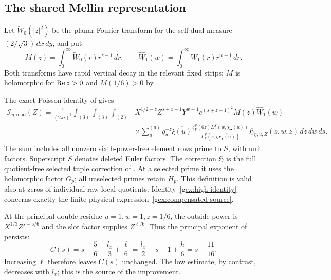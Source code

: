 \subsection{The shared Mellin representation}

Let $\widetilde W_0(|z|^2)$ be the planar Fourier transform for the
self-dual measure $(2/\sqrt3)\,dx\,dy$, and put
\[
 M(z)=\int_0^\infty\widetilde W_0(r)r^{z-1}\,dr,
 \qquad \widehat W_1(w)=\int_0^\infty W_1(r)r^{w-1}\,dr.
\]
Both transforms have rapid vertical decay in the relevant fixed
strips; $M$ is holomorphic for $\operatorname{Re} z>0$ and $M(1/6)>0$
by \cite[Section 7.1]{OAI26}.

The exact Poisson identity of \cite[Section 16.1]{OAI26} gives
\begin{equation}\label{gex:high-identity}
\begin{split}
 \mathcal I_{\eta,\mathrm{mod}}(Z)
 =\frac1{(2\pi i)^3}\int_{(3)}\int_{(3)}\int_{(2)}
 &X^{1/2-z}Z^{s+z-1}Y^{w-1}
   e^{(s+z-1)^2}M(z)\widehat W_1(w)\\
 &\times\sum_u^{(6)}q_u^{-z}\overline{\xi(u)}
 \frac{\zeta_F^S(6z)L_F^S(w,\chi_\bullet(u))}{
       L_F^S(s,\eta\overline{\chi_\bullet(u)})}
 \mathfrak H_{\eta,u,Z}(s,w,z)\,dz\,dw\,ds.
\end{split}
\end{equation}
The sum includes all nonzero sixth-power-free element rows prime
to $S$, with unit factors. Superscript $S$ denotes deleted Euler
factors. The correction $\mathfrak H$ is the full quotient-free
selected tuple correction of \cite[(16.3)]{OAI26}. At a selected
prime it uses the holomorphic factor $G_p$; all unselected primes
retain $H_p$. This definition is valid also at zeros of individual
raw local quotients. Identity~\eqref{gex:high-identity} concerns
exactly the finite physical expression~\eqref{gex:compensated-source}.

At the principal double residue $u=1,w=1,z=1/6$, the outside
power is $X^{1/3}Z^{s-5/6}$ and the slot factor supplies
$Z^{\ell/6}$. Thus the principal exponent of \cite[(12.3)]{OAI26} persists:
\begin{equation}\label{gex:principal-exponent}
 C(s)=s-\frac56+\frac{l_x}{3}+\frac\ell6
     =\frac{l_x}{2}+s-1+\frac h6=s-\frac{11}{16}.
\end{equation}
Increasing $\ell$ therefore leaves $C(s)$ unchanged. The low
estimate, by contrast, decreases with $l_x$; this is the source
of the improvement.
